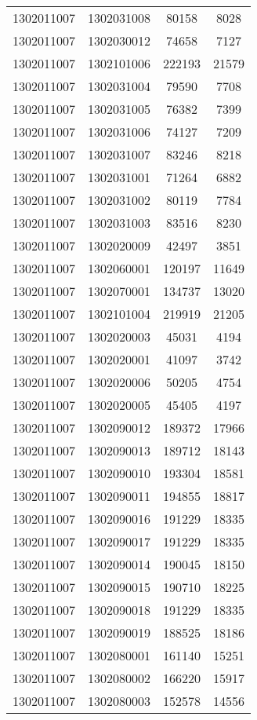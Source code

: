 \begin{longtable}[h]{llcc}
		1302011007 & 1302031008 & 80158 & 8028\\
		1302011007 & 1302030012 & 74658 & 7127\\
		1302011007 & 1302101006 & 222193 & 21579\\
		1302011007 & 1302031004 & 79590 & 7708\\
		1302011007 & 1302031005 & 76382 & 7399\\
		1302011007 & 1302031006 & 74127 & 7209\\
		1302011007 & 1302031007 & 83246 & 8218\\
		1302011007 & 1302031001 & 71264 & 6882\\
		1302011007 & 1302031002 & 80119 & 7784\\
		1302011007 & 1302031003 & 83516 & 8230\\
		1302011007 & 1302020009 & 42497 & 3851\\
		1302011007 & 1302060001 & 120197 & 11649\\
		1302011007 & 1302070001 & 134737 & 13020\\
		1302011007 & 1302101004 & 219919 & 21205\\
		1302011007 & 1302020003 & 45031 & 4194\\
		1302011007 & 1302020001 & 41097 & 3742\\
		1302011007 & 1302020006 & 50205 & 4754\\
		1302011007 & 1302020005 & 45405 & 4197\\
		1302011007 & 1302090012 & 189372 & 17966\\
		1302011007 & 1302090013 & 189712 & 18143\\
		1302011007 & 1302090010 & 193304 & 18581\\
		1302011007 & 1302090011 & 194855 & 18817\\
		1302011007 & 1302090016 & 191229 & 18335\\
		1302011007 & 1302090017 & 191229 & 18335\\
		1302011007 & 1302090014 & 190045 & 18150\\
		1302011007 & 1302090015 & 190710 & 18225\\
		1302011007 & 1302090018 & 191229 & 18335\\
		1302011007 & 1302090019 & 188525 & 18186\\
		1302011007 & 1302080001 & 161140 & 15251\\
		1302011007 & 1302080002 & 166220 & 15917\\
		1302011007 & 1302080003 & 152578 & 14556\\

\end{longtable}
